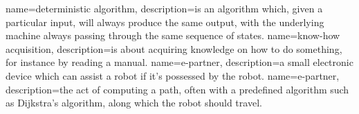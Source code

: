 {
  name=deterministic algorithm,
  description={is an algorithm which, given a particular input,
  		 will always produce the same output, with the 
  		 underlying machine always passing through 
  		 the same sequence of states. }
}
{
  name=know-how acquisition,
  description={is about acquiring knowledge on how to do something, for 				instance by reading a manual. }
}
{
  name=e-partner,
  description={a small electronic device which can assist a robot if it's 			possessed by the robot. }
}
{
  name=e-partner,
  description={the act of computing a path, often with a predefined 					algorithm such as Dijkstra's algorithm, along which the robot 			should travel. }
}